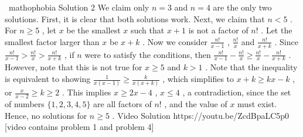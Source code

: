 \documentclass[12pt]{article}
\begin{document}
~mathophobia Solution 2 We claim only $n = 3$ and $n = 4$ are the only two solutions. First, it is clear that both solutions work. Next, we claim that $n < 5$ . For $n \geq 5$ , let $x$ be the smallest $x$ such that $x+1$ is not a factor of $n!$ . Let the smallest factor larger than $x$ be $x+k$ . Now we consider $\frac{n!}{x-1}$ , $\frac{n!}{x}$ and $\frac{n!}{x+k}$ . Since $\frac{n!}{x-1} > \frac{n!}{x} > \frac{n!}{x+k}$ , if $n$ were to satisfy the conditions, then $\frac{n!}{x-1}-\frac{n!}{x} \geq \frac{n!}{x} - \frac{n!}{x+k}$ . However, note that this is not true for $x \geq 5$ and $k > 1$ . Note that the inequality is equivalent to showing $\frac{1}{x(x-1)} \geq \frac{k}{x(x+k)}$ , which simplifies to $x+k \geq kx-k$ , or $\frac{x}{x-2} \geq k \geq 2$ . This implies $x \geq 2x-4$ , $x \leq 4$ , a contradiction, since the set of numbers $\{1, 2, 3, 4, 5\}$ are all factors of $n!$ , and the value of $x$ must exist. Hence, no solutions for $n \geq 5$ . Video Solution https://youtu.be/ZcdBpaLC5p0 [video contains problem 1 and problem 4]
\end{document}
